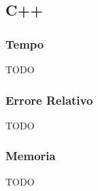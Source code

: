 \documentclass[11pt,italian]{article}
\begin{document}
\subsection{C++}
\subsubsection*{Tempo}
TODO
\begin{figure}[H]
\end{figure}

\subsubsection*{Errore Relativo}
TODO
\begin{figure}[H]
\end{figure}

\subsubsection*{Memoria}
TODO
\begin{figure}[H]
\end{figure}
\end{document}

